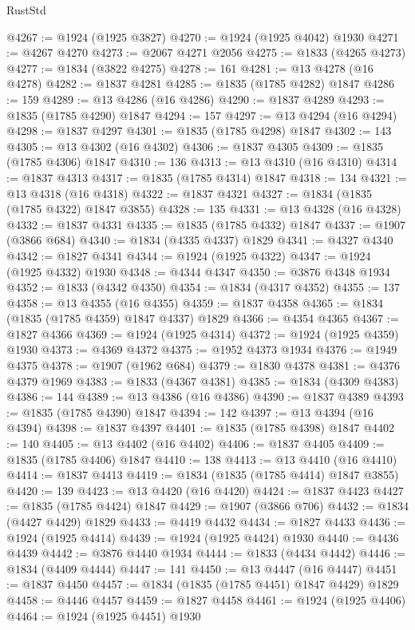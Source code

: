 \begin{lexlean}{RustStd}
\begin{coremodule}
{\begin{coremodule}
{{{{{@4267 := @1924 (@1925 @3827)
@4270 := @1924 (@1925 @4042) @1930
@4271 := @4267 @4270
@4273 := @2067 @4271 @2056
@4275 := @1833 (@4265 @4273)
@4277 := @1834 (@3822 @4275)
@4278 := 161
@4281 := @13 @4278 (@16 @4278)
@4282 := @1837 @4281
@4285 := @1835 (@1785 @4282) @1847
@4286 := 159
@4289 := @13 @4286 (@16 @4286)
@4290 := @1837 @4289
@4293 := @1835 (@1785 @4290) @1847
@4294 := 157
@4297 := @13 @4294 (@16 @4294)
@4298 := @1837 @4297
@4301 := @1835 (@1785 @4298) @1847
@4302 := 143
@4305 := @13 @4302 (@16 @4302)
@4306 := @1837 @4305
@4309 := @1835 (@1785 @4306) @1847
@4310 := 136
@4313 := @13 @4310 (@16 @4310)
@4314 := @1837 @4313
@4317 := @1835 (@1785 @4314) @1847
@4318 := 134
@4321 := @13 @4318 (@16 @4318)
@4322 := @1837 @4321
@4327 := @1834 (@1835 (@1785 @4322) @1847 @3855)
@4328 := 135
@4331 := @13 @4328 (@16 @4328)
@4332 := @1837 @4331
@4335 := @1835 (@1785 @4332) @1847
@4337 := @1907 (@3866 @684)
@4340 := @1834 (@4335 @4337) @1829
@4341 := @4327 @4340
@4342 := @1827 @4341
@4344 := @1924 (@1925 @4322)
@4347 := @1924 (@1925 @4332) @1930
@4348 := @4344 @4347
@4350 := @3876 @4348 @1934
@4352 := @1833 (@4342 @4350)
@4354 := @1834 (@4317 @4352)
@4355 := 137
@4358 := @13 @4355 (@16 @4355)
@4359 := @1837 @4358
@4365 := @1834 (@1835 (@1785 @4359) @1847 @4337) @1829
@4366 := @4354 @4365
@4367 := @1827 @4366
@4369 := @1924 (@1925 @4314)
@4372 := @1924 (@1925 @4359) @1930
@4373 := @4369 @4372
@4375 := @1952 @4373 @1934
@4376 := @1949 @4375
@4378 := @1907 (@1962 @684)
@4379 := @1830 @4378
@4381 := @4376 @4379 @1969
@4383 := @1833 (@4367 @4381)
@4385 := @1834 (@4309 @4383)
@4386 := 144
@4389 := @13 @4386 (@16 @4386)
@4390 := @1837 @4389
@4393 := @1835 (@1785 @4390) @1847
@4394 := 142
@4397 := @13 @4394 (@16 @4394)
@4398 := @1837 @4397
@4401 := @1835 (@1785 @4398) @1847
@4402 := 140
@4405 := @13 @4402 (@16 @4402)
@4406 := @1837 @4405
@4409 := @1835 (@1785 @4406) @1847
@4410 := 138
@4413 := @13 @4410 (@16 @4410)
@4414 := @1837 @4413
@4419 := @1834 (@1835 (@1785 @4414) @1847 @3855)
@4420 := 139
@4423 := @13 @4420 (@16 @4420)
@4424 := @1837 @4423
@4427 := @1835 (@1785 @4424) @1847
@4429 := @1907 (@3866 @706)
@4432 := @1834 (@4427 @4429) @1829
@4433 := @4419 @4432
@4434 := @1827 @4433
@4436 := @1924 (@1925 @4414)
@4439 := @1924 (@1925 @4424) @1930
@4440 := @4436 @4439
@4442 := @3876 @4440 @1934
@4444 := @1833 (@4434 @4442)
@4446 := @1834 (@4409 @4444)
@4447 := 141
@4450 := @13 @4447 (@16 @4447)
@4451 := @1837 @4450
@4457 := @1834 (@1835 (@1785 @4451) @1847 @4429) @1829
@4458 := @4446 @4457
@4459 := @1827 @4458
@4461 := @1924 (@1925 @4406)
@4464 := @1924 (@1925 @4451) @1930
}}}}}
\end{coremodule}}
\end{coremodule}
\end{lexlean}
